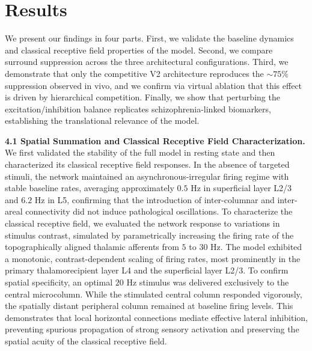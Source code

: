 \section{Results}
\label{sec:results}

%
We present our findings in four parts. First, we validate the baseline dynamics and classical receptive field properties of the model. Second, we compare surround suppression across the three architectural configurations. Third, we demonstrate that only the competitive V2 architecture reproduces the $\sim 75\%$ suppression observed in vivo, and we confirm via virtual ablation that this effect is driven by hierarchical competition. Finally, we show that perturbing the excitation/inhibition balance replicates schizophrenia-linked biomarkers, establishing the translational relevance of the model.

\label{sec:results_crf}
\textbf{4.1 Spatial Summation and Classical Receptive Field Characterization.} We first validated the stability of the full model in resting state and then characterized its classical receptive field responses. In the absence of targeted stimuli, the network maintained an asynchronous-irregular firing regime with stable baseline rates, averaging approximately $0.5$ Hz in superficial layer L2/3 and $6.2$ Hz in L5, confirming that the introduction of inter-columnar and inter-areal connectivity did not induce pathological oscillations. To characterize the classical receptive field, we evaluated the network response to variations in stimulus contrast, simulated by parametrically increasing the firing rate of the topographically aligned thalamic afferents from $5$ to $30$ Hz. The model exhibited a monotonic, contrast-dependent scaling of firing rates, most prominently in the primary thalamorecipient layer L4 and the superficial layer L2/3. To confirm spatial specificity, an optimal $20$ Hz stimulus was delivered exclusively to the central microcolumn. While the stimulated central column responded vigorously, the spatially distant peripheral column remained at baseline firing levels. This demonstrates that local horizontal connections mediate effective lateral inhibition, preventing spurious propagation of strong sensory activation and preserving the spatial acuity of the classical receptive field.

